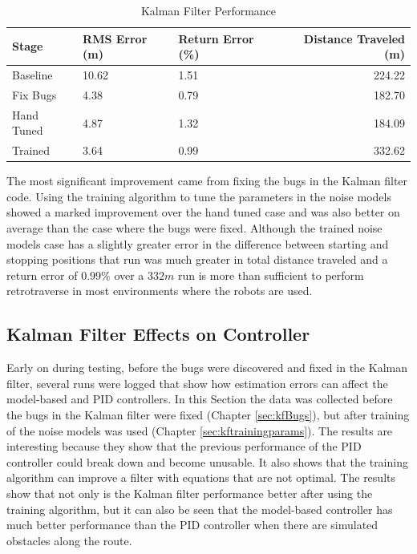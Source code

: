 \begin{table}[ht!]
\caption{Kalman Filter Performance}
\small
\centering
\begin{tabular}{@{}lllr@{}} \toprule
Stage      & RMS Error (m)  & Return Error (\%) & Distance Traveled (m) \\ \midrule
Baseline   & 10.62          & 1.51              & 224.22 \\
Fix Bugs   & 4.38           & 0.79              & 182.70 \\
Hand Tuned & 4.87           & 1.32              & 184.09 \\
Trained    & 3.64           & 0.99              & 332.62 \\ \bottomrule
\end{tabular}
\label{tab:resultsKF}
\end{table}

The most significant improvement came from fixing the bugs in the Kalman filter code. Using the training algorithm to tune the parameters in the noise models showed a marked improvement over the hand tuned case and was also better on average than the case where the bugs were fixed. Although the trained noise models case has a slightly greater error in the difference between starting and stopping positions that run was much greater in total distance traveled and a return error of $0.99\%$ over a $332m$ run is more than sufficient to perform retrotraverse in most environments where the robots are used.

\subsection{Kalman Filter Effects on Controller}
Early on during testing, before the bugs were discovered and fixed in the Kalman filter, several runs were logged that show how estimation errors can affect the model-based and PID controllers. In this Section the data was collected before the bugs in the Kalman filter were fixed (Chapter \ref{sec:kfBugs}), but after training of the noise models was used (Chapter \ref{sec:kftrainingparams}). The results are interesting because they show that the previous performance of the PID controller could break down and become unusable. It also shows that the training algorithm can improve a filter with equations that are not optimal. The results show that not only is the Kalman filter performance better after using the training algorithm, but it can also be seen that the model-based controller has much better performance than the PID controller when there are simulated obstacles along the route.

